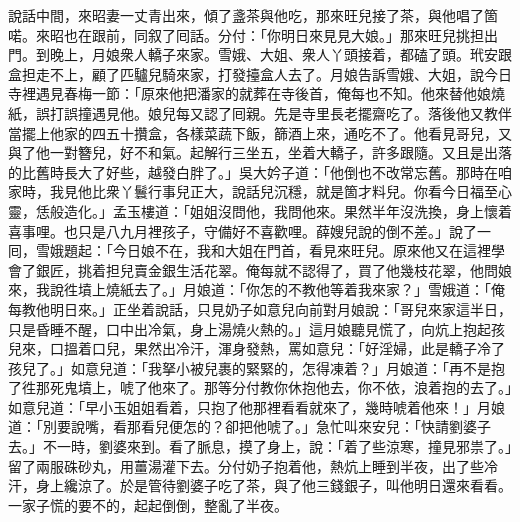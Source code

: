說話中間，來昭妻一丈青出來，傾了盞茶與他吃，那來旺兒接了茶，與他唱了箇喏。來昭也在跟前，同叙了囘話。分付：「你明日來見見大娘。」那來旺兒挑担出門。到晚上，月娘衆人轎子來家。雪娥、大姐、衆人丫頭接着，都磕了頭。玳安跟盒担走不上，顧了匹驢兒騎來家，打發擡盒人去了。月娘告訴雪娥、大姐，說今日寺裡遇見春梅一節：「原來他把潘家的就葬在寺後首，俺每也不知。他來替他娘燒紙，誤打誤撞遇見他。娘兒每又認了囘親。先是寺里長老擺齋吃了。落後他又教伴當擺上他家的四五十攢盒，各樣菜蔬下飯，篩酒上來，通吃不了。他看見哥兒，又與了他一對簪兒，好不和氣。起解行三坐五，坐着大轎子，許多跟隨。又且是出落的比舊時長大了好些，越發白胖了。」{}吳大妗子道：「他倒也不改常忘舊。那時在咱家時，我見他比衆丫鬟行事兒正大，說話兒沉穩，就是箇才料兒。你看今日福至心靈，恁般造化。」{}孟玉樓道：「姐姐沒問他，我問他來。果然半年沒洗換，身上懷着喜事哩。也只是八九月裡孩子，守備好不喜歡哩。薛嫂兒說的倒不差。」說了一囘，雪娥題起：「今日娘不在，我和大姐在門首，看見來旺兒。原來他又在這裡學會了銀匠，挑着担兒賣金銀生活花翠。俺每就不認得了，買了他幾枝花翠，他問娘來，我說徃墳上燒紙去了。」月娘道：「你怎的不教他等着我來家？」雪娥道：「俺每教他明日來。」正坐着說話，只見奶子如意兒向前對月娘說：「哥兒來家這半日，只是昏睡不醒，口中出冷氣，身上湯燒火熱的。」這月娘聽見慌了，向炕上抱起孩兒來，口搵着口兒，果然出冷汗，渾身發熱，罵如意兒：「好淫婦，此是轎子冷了孩兒了。」如意兒道：「我拏小被兒裹的緊緊的，怎得凍着？」月娘道：「再不是抱了徃那死鬼墳上，唬了他來了。那等分付教你休抱他去，你不依，浪着抱的去了。」如意兒道：「早小玉姐姐看着，只抱了他那裡看看就來了，幾時唬着他來！」月娘道：「別要說嘴，看那看兒便怎的？卻把他唬了。」急忙叫來安兒：「快請劉婆子去。」不一時，劉婆來到。看了脈息，摸了身上，說：「着了些涼寒，撞見邪祟了。」{}留了兩服硃砂丸，用薑湯灌下去。分付奶子抱着他，熱炕上睡到半夜，出了些冷汗，身上纔涼了。於是管待劉婆子吃了茶，與了他三錢銀子，叫他明日還來看看。一家子慌的要不的，起起倒倒，整亂了半夜。

